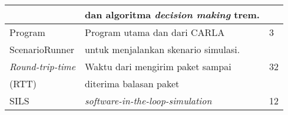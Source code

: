 \begin{table*}[!ht]
\begin{tabular}{|l|l|l|}
		                           & dan algoritma \textit{decision making} trem. &                  \\
		\hline
		Program                    & Program utama dan dari CARLA                 & 3                \\
		ScenarioRunner             & untuk menjalankan skenario simulasi.         &                  \\
		\hline
		\textit{Round-trip-time}   & Waktu dari mengirim paket sampai             & 32               \\
		(RTT)                      & diterima balasan paket                       &                  \\
		\hline
		SILS                       & \textit{software-in-the-loop-simulation}     & 12               \\
		\hline
	\end{tabular}
\end{table*}
